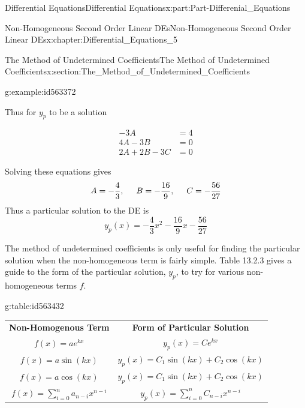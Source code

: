 \documentclass[oneside,10pt,]{book}
\newcommand{\tabularfont}{\relax}
\numberwithin{equation}{section}
\newcommand{\hrulethin}  {\noalign{\hrule height 0.04em}}
\newcommand{\amp}{&}
\begin{document}
\begin{partptx}{Differential Equations}{}{Differential Equations}{}{}{x:part:Part-Differenial_Equations}
\begin{chapterptx}{Non-Homogeneous Second Order Linear DEs}{}{Non-Homogeneous Second Order Linear DEs}{}{}{x:chapter:Differential_Equations_5}
\begin{sectionptx}{The Method of Undetermined Coefficients}{}{The Method of Undetermined Coefficients}{}{}{x:section:The_Method_of_Undetermined_Coefficients}
\begin{example}{}{g:example:id563372}
%
\par
Thus for \(y_p\) to be a solution%
\par
%
\begin{align*}
-3A \amp = 4\\
4A-3B \amp = 0\\
2A+2B-3C \amp = 0
\end{align*}
%
\par
Solving these equations gives%
\begin{equation*}
A=-\frac{4}{3}, \hspace{5mm} B=-\frac{16}{9}, \hspace{5mm} C=-\frac{56}{27}
\end{equation*}
Thus a particular solution to the DE is%
\begin{equation*}
y_p(x)=-\frac{4}{3}x^2-\frac{16}{9}x-\frac{56}{27}
\end{equation*}
%
\end{example}
The method of undetermined coefficients is only useful for finding the particular solution when the non-homogeneous term is fairly simple. Table 13.2.3 gives a guide to the form of the particular solution, \(y_p\), to try for various non-homogeneous terms \(f\). \begin{tableptx}{\textbf{}}{g:table:id563432}{}%
\centering%
{\tabularfont%
\begin{tabular}{cc}
\textbf{Non-Homogenous Term}&\textbf{Form of Particular Solution}\tabularnewline\hrulethin
\(f(x)=ae^{kx}\)&\(y_p(x)=Ce^{kx}\)\tabularnewline[0pt]
\(f(x)=a\sin(kx)\)&\(y_p(x)=C_1\sin(kx)+C_2\cos(kx)\)\tabularnewline[0pt]
\(f(x)=a\cos(kx)\)&\(y_p(x)=C_1\sin(kx)+C_2\cos(kx)\)\tabularnewline[0pt]
\(f(x)=\sum_{i=0}^{n} a_{n-i}x^{n-i}\)&\(y_p(x)=\sum_{i=0}^{n} C_{n-i}x^{n-i}\)\tabularnewline[0pt]


\end{tabular}}
\end{tableptx}
\end{sectionptx}
\end{chapterptx}
\end{partptx}
\end{document}
